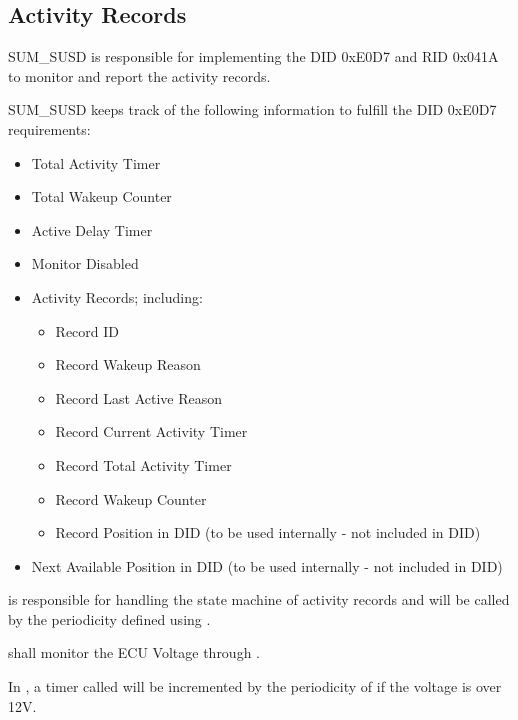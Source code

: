\subsection{Activity Records}\label{sec:activity_records}

{SUM_SUSD is responsible for implementing the DID 0xE0D7 and RID 0x041A to monitor and report the activity records.}
{  }

{SUM_SUSD keeps track of the following information to fulfill the DID 0xE0D7 requirements:
\begin{itemize}
	\item Total Activity Timer
	\item Total Wakeup Counter
	\item Active Delay Timer
	\item Monitor Disabled
	\item Activity Records; including:
	\begin{itemize}
		\item Record ID
		\item Record Wakeup Reason
		\item Record Last Active Reason
		\item Record Current Activity Timer
		\item Record Total Activity Timer
		\item Record Wakeup Counter
		\item Record Position in DID (to be used internally - not included in DID)
	\end{itemize}
	\item Next Available Position in DID (to be used internally - not included in DID)
\end{itemize}
}
{}

{ is responsible for handling the state machine of activity records and will be called by the periodicity defined using .}
{}

{ shall monitor the ECU Voltage through .}
{}

{In , a timer called  will be incremented by the periodicity of  if the voltage is over 12V.}
{}

